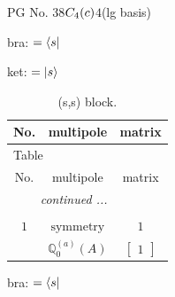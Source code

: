\documentclass[fleqn,8pt,landscape]{jsarticle}
\begin{document}
\setcounter{MaxMatrixCols}{32}

\renewcommand{\tablename}{Table~}
\renewcommand{\figurename}{Figure~}
\begin{center}
\LARGE
PG No. 38\quad$C_{\rm 4}(c)$\quad$4$\quad[ tetragonal ] (lg basis)
\end{center}
bra: $=\bra{s}$

\noindent
ket: $=\ket{s}$
\renewcommand{\arraystretch}{1.6}
\begin{longtable}{ccc}
\caption{(s,s) block.}
 \\
 \hline \hline
No. & multipole & matrix \\ \hline \endfirsthead

\multicolumn{2}{l}{\tablename\ \thetable{}} \\
 \hline \hline
No. & multipole & matrix \\ \hline \endhead

 \hline \hline
\multicolumn{2}{r}{\footnotesize\it continued ...} \\ \endfoot

 \hline \hline
\multicolumn{2}{r}{} \\ \endlastfoot

$ 1 $ & $ \text{symmetry} $ & $ 1 $ \\
$  $ & $ \mathbb{Q}_{0}^{(a)}(A) $ & $ \begin{bmatrix} 1 \end{bmatrix} $ \\ \hline
\end{longtable}
bra: $=\bra{s}$
\end{document}
